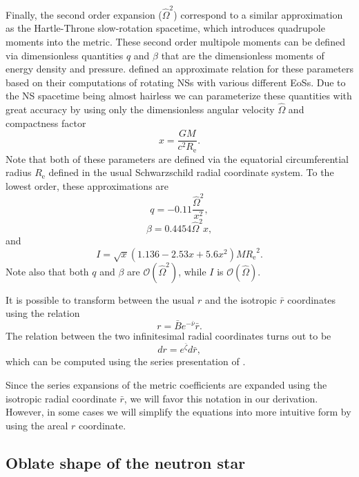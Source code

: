 \documentclass[iop, usenatbib]{emulateapj}
\newcommand{\be}{\begin{equation}}
\newcommand{\ee}{\end{equation}}
\newcommand{\Req}{\ensuremath{R_{\mathrm{e}}}}
\newcommand{\sch}{Schwarzschild }
\newcommand{\rb}{\ensuremath{\bar{r}}}
\newcommand{\Ob}{\ensuremath{\hat{\Omega}}}
\newcommand{\nub}{\ensuremath{\bar{\nu}}}
\newcommand{\zetab}{\ensuremath{\bar{\zeta}}}
\newcommand{\Bb}{\ensuremath{\bar{B}}}
\begin{document}
Finally, the second order expansion ($\Ob^2$) correspond to a similar
approximation as the Hartle-Throne slow-rotation spacetime, which
introduces quadrupole moments into the metric.  These second order
multipole moments can be defined via dimensionless quantities $q$ and
$\beta$ that are the dimensionless moments of energy density and
pressure.  \citet{aGM14} defined an approximate relation for these
parameters based on their computations of rotating NSs with various
different EoSs.  Due to the NS spacetime being almost hairless we can
parameterize these quantities with great accuracy by using only the
dimensionless angular velocity $\Ob$ and compactness factor
\be
x = \frac{G M}{c^2 \Req}.
\ee
Note that both of these parameters are defined via the equatorial
circumferential radius $\Req$ defined in the usual \sch radial coordinate
system.
To the lowest order, these approximations are
\be
q = -0.11 \frac{\Ob^2}{x^2},
\ee
\be
\beta = 0.4454 \Ob^2 x,
\ee
and
\be
I = \sqrt{x} (1.136 - 2.53 x + 5.6 x^2) M \Req^2.
\ee
Note also that both $q$ and $\beta$ are $\mathcal{O}(\Ob^2)$, while $I$ is $\mathcal{O}(\Ob)$.
    
It is possible to transform between the usual $r$ and the isotropic $\rb$
coordinates using the relation \citep{FIP86}
\be\label{eq:rb2r}
r = \Bb e^{-\nub} \rb.
\ee
The relation between the two infinitesimal radial coordinates turns out to be
\be\label{eq:drb2dr}
dr = e^{\zetab} d\rb,
\ee
which can be computed using the series presentation of \cite{BI76}.

Since the series expansions of the metric coefficients are expanded
using the isotropic radial coordinate $\rb$, we will favor this notation
in our derivation.  However, in some cases we will simplify the
equations into more intuitive form by using the areal $r$ coordinate.


\subsection{Oblate shape of the neutron star}
\end{document}
